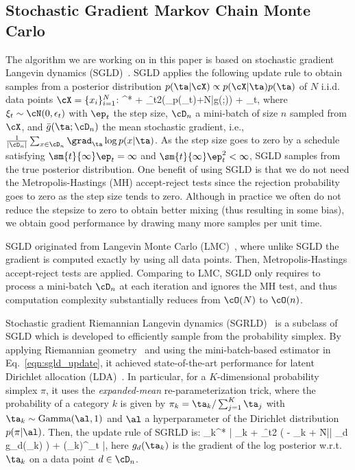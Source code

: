 \subsection{Stochastic Gradient Markov Chain Monte Carlo}
The algorithm we are working on in this paper is based on stochastic gradient Langevin dynamics (SGLD)~\cite{welling2011bayesian}. SGLD applies the following update rule to obtain samples from a posterior distribution $p(\ta|\cX) \propto p(\cX|\ta) p(\ta)$ of $N$ i.i.d. data points $\cX=\{x_i\}_{i=1}^{N}$:
\bea
\ta^* \law \ta + \f{\epsilon_t}{2}\left(\nabla_{\ta}\log p(\ta_t)+N\bar{g}(\ta;\SGLDMinibatch)\right) + \xi_t, \label{eqn:sgld_update}
\eea
where $\xi_t \sim \cN(0,\epsilon_t )$ with $\ep_t$ the step size, $\SGLDMinibatch$ a mini-batch of size $n$ sampled from $\cX$, and $\bar{g}(\ta;\SGLDMinibatch)$ the mean stochastic gradient, i.e., $\frac{1}{|\SGLDMinibatch|}\sum_{x\in \SGLDMinibatch}^{}\grad_{\ta} \log p(x|\ta)$. As the step size goes to zero by a schedule satisfying $\sm{t}{\infty}\ep_t = \infty$ and $\sm{t}{\infty}\ep_t^2 < \infty$, SGLD samples from the true posterior distribution. One benefit of using SGLD is that we do not need the Metropolis-Hastings (MH) accept-reject tests since the rejection probability goes to zero as the step size tends to zero. Although in practice we often do not reduce the stepsize to zero to obtain better mixing (thus resulting in some bias), we obtain good performance by drawing many more samples per unit time. 

SGLD originated from Langevin Monte Carlo (LMC)~\cite{girolami2011riemann}, where unlike SGLD the gradient is computed exactly by using all data points. Then, Metropolis-Hastings accept-reject tests are applied. Comparing to LMC, SGLD only requires to process a mini-batch $\SGLDMinibatch$ at each iteration and ignores the MH test, and thus computation complexity substantially reduces from $\cO(N)$ to $\cO(n)$.   

Stochastic gradient Riemannian Langevin dynamics (SGRLD)~\cite{patterson2013stochastic} is a subclass of SGLD which is developed to efficiently sample from the probability simplex. By applying Riemannian geometry~\cite{girolami2011riemann} and using the mini-batch-based estimator in Eq.~\ref{eqn:sgld_update}, it achieved state-of-the-art performance for latent Dirichlet allocation (LDA)~\cite{blei2003latent}. In particular, for a $K$-dimensional probability simplex $\pi$, it uses the \textit{expanded-mean} re-parameterization trick, where the probability of a category $k$ is given by $\pi_k = \ta_k / \sum_{j=1}^K \ta_j$ with $\ta_k \sim \text{Gamma}(\al,1)$ and $\al$ a hyperparameter of the Dirichlet distribution $p(\pi | \al )$. Then, the update rule of SGRLD is:
\bea
\ta_{k}^* \law \left| \ta_{k} + \f{\ep_t}{2} \left( \al - \ta_{k} + \f{N}{|\SGLDMinibatch|} \sum_{d \in \SGLDMinibatch} g_d(\ta_{k}) \right) + (\ta_{k})^\ha \xi_{t} \right|, \label{eqn:sgrld_update}
\eea
here $g_d(\ta_{k})$ is the gradient of the log posterior w.r.t. $\ta_{k}$ on a data point $d\in \SGLDMinibatch$.

